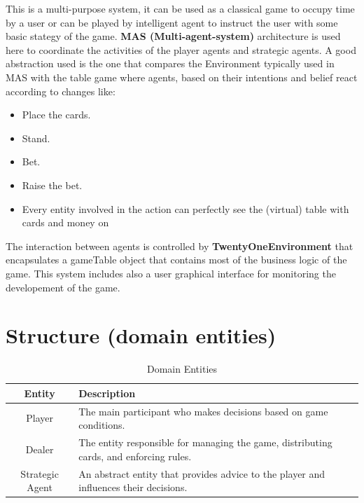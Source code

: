 This is a multi-purpose system, it can be used as a classical game to occupy time by a user or can be played by intelligent agent to instruct the user with some basic stategy of the game. \textbf{MAS (Multi-agent-system)} architecture is used here to coordinate the activities of the player agents and strategic agents. A good abstraction used is the one that compares the Environment typically used in MAS with the table game where agents, based on their intentions and belief react according to changes like: 
\begin{itemize}
    \item Place the cards.
    \item Stand.
    \item Bet.
    \item Raise the bet.
    \item Every entity involved in the action can perfectly see the (virtual) table with cards and money on
 \end{itemize}

The interaction between agents is controlled by \textbf{TwentyOneEnvironment} that encapsulates a gameTable object that contains most of the business logic of the game. This system includes also a user graphical interface for monitoring the developement of the game.

\section{Structure (domain entities)}

\begin{table}[h]
    \centering
    \renewcommand{\arraystretch}{1.3}
    \begin{tabular}{|c|p{8cm}|}
        \hline
        \textbf{Entity} & \textbf{Description} \\
        \hline
        Player & The main participant who makes decisions based on game conditions. \\
        \hline
        Dealer & The entity responsible for managing the game, distributing cards, and enforcing rules. \\
        \hline
        Strategic Agent & An abstract entity that provides advice to the player and influences their decisions. \\
        \hline
    \end{tabular}
    \caption{Domain Entities}
    \label{tab:domain_entities}
\end{table}

